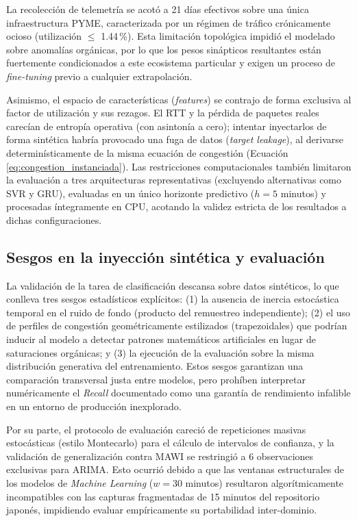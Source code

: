 \documentclass[12pt]{report}
\begin{document}
La recolección de telemetría se acotó a 21 días efectivos sobre una única infraestructura PYME, caracterizada por un régimen de tráfico crónicamente ocioso (utilización $\leq$ 1.44\,\%). Esta limitación topológica impidió el modelado sobre anomalías orgánicas, por lo que los pesos sinápticos resultantes están fuertemente condicionados a este ecosistema particular y exigen un proceso de \textit{fine-tuning} previo a cualquier extrapolación.

Asimismo, el espacio de características (\textit{features}) se contrajo de forma exclusiva al factor de utilización y sus rezagos. El RTT y la pérdida de paquetes reales carecían de entropía operativa (con asintonía a cero); intentar inyectarlos de forma sintética habría provocado una fuga de datos (\textit{target leakage}), al derivarse determinísticamente de la misma ecuación de congestión (Ecuación \ref{eq:congestion_instanciada}). Las restricciones computacionales también limitaron la evaluación a tres arquitecturas representativas (excluyendo alternativas como SVR y GRU), evaluadas en un único horizonte predictivo ($h=5$ minutos) y procesadas íntegramente en CPU, acotando la validez estricta de los resultados a dichas configuraciones.
\subsection*{Sesgos en la inyección sintética y evaluación}

La validación de la tarea de clasificación descansa sobre datos sintéticos, lo que conlleva tres sesgos estadísticos explícitos: (1) la ausencia de inercia estocástica temporal en el ruido de fondo (producto del remuestreo independiente); (2) el uso de perfiles de congestión geométricamente estilizados (trapezoidales) que podrían inducir al modelo a detectar patrones matemáticos artificiales en lugar de saturaciones orgánicas; y (3) la ejecución de la evaluación sobre la misma distribución generativa del entrenamiento. Estos sesgos garantizan una comparación transversal justa entre modelos, pero prohíben interpretar numéricamente el \textit{Recall} documentado como una garantía de rendimiento infalible en un entorno de producción inexplorado.

Por su parte, el protocolo de evaluación careció de repeticiones masivas estocásticas (estilo Montecarlo) para el cálculo de intervalos de confianza, y la validación de generalización contra MAWI se restringió a 6 observaciones exclusivas para ARIMA. Esto ocurrió debido a que las ventanas estructurales de los modelos de \textit{Machine Learning} ($w=30$ minutos) resultaron algorítmicamente incompatibles con las capturas fragmentadas de 15 minutos del repositorio japonés, impidiendo evaluar empíricamente su portabilidad inter-dominio.
\end{document}
